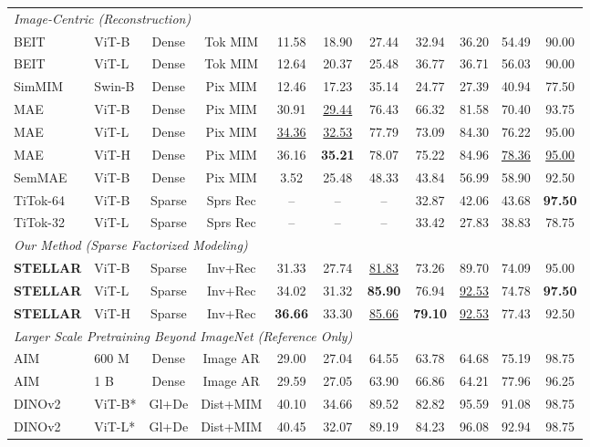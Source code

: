\begin{table}[t]
\begin{center}
\begin{small}
\begin{sc}
\begin{tabular}{l l c c | c c c | c c c c}
\midrule
\multicolumn{11}{l}{\it Image-Centric (Reconstruction)} \\
BEIT & ViT-B & Dense & Tok MIM & 11.58 & 18.90 & 27.44 & 32.94 & 36.20 & 54.49 & 90.00 \\
BEIT & ViT-L & Dense & Tok MIM & 12.64 & 20.37 & 25.48 & 36.77 & 36.71 & 56.03 & 90.00 \\
SimMIM & Swin-B & Dense & Pix MIM & 12.46 & 17.23 & 35.14 & 24.77 & 27.39 & 40.94 & 77.50 \\
MAE & ViT-B & Dense & Pix MIM & 30.91 & \underline{29.44} & 76.43 & 66.32 & 81.58 & 70.40 & 93.75 \\
MAE & ViT-L & Dense & Pix MIM & \underline{34.36} & \underline{32.53} & 77.79 & 73.09 & 84.30 & 76.22 & 95.00 \\
MAE & ViT-H & Dense & Pix MIM & 36.16 & \bf{35.21} & 78.07 & 75.22 & 84.96 & \underline{78.36} & \underline{95.00} \\
SemMAE & ViT-B & Dense & Pix MIM & 3.52 & 25.48 & 48.33 & 43.84 & 56.99 & 58.90 & 92.50 \\
TiTok-64 & ViT-B & Sparse & Sprs Rec & -- & -- & -- & 32.87 & 42.06 & 43.68 & \textbf{97.50} \\
TiTok-32 & ViT-L & Sparse & Sprs Rec & -- & -- & -- & 33.42 & 27.83 & 38.83 & 78.75 \\
\midrule
\multicolumn{11}{l}{\it Our Method (Sparse Factorized Modeling)} \\
\bf STELLAR & ViT-B & Sparse & Inv+Rec & 31.33 & 27.74 & \underline{81.83} & 73.26 & 89.70 & 74.09 & 95.00 \\
\bf STELLAR & ViT-L & Sparse & Inv+Rec & 34.02 & 31.32 & \textbf{85.90} & 76.94 & \underline{92.53} & 74.78 & \textbf{97.50} \\
\bf STELLAR & ViT-H & Sparse & Inv+Rec & \textbf{36.66} & 33.30 & \underline{85.66} & \textbf{79.10} & \underline{92.53} & 77.43 & 92.50 \\
\midrule
\multicolumn{11}{l}{\it Larger Scale Pretraining Beyond ImageNet (Reference Only)} \\
AIM & 600 M & Dense & Image AR & 29.00 & 27.04 & 64.55 & 63.78 & 64.68 & 75.19 & 98.75 \\
AIM & 1 B & Dense & Image AR & 29.59 & 27.05 & 63.90 & 66.86 & 64.21 & 77.96 & 96.25 \\
DINOv2 & ViT-B* & Gl+De & Dist+MIM & 40.10 & 34.66 & 89.52 & 82.82 & 95.59 & 91.08 & 98.75 \\
DINOv2 & ViT-L* & Gl+De & Dist+MIM & 40.45 & 32.07 & 89.19 & 84.23 & 96.08 & 92.94 & 98.75 \\
\bottomrule
\end{tabular}
\end{sc}
\end{small}
\end{center}
\vskip -0.1in
\end{table}

